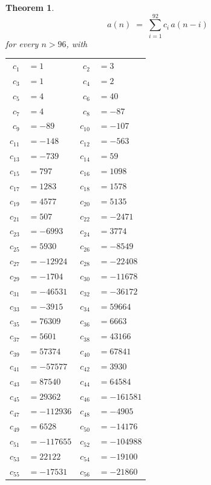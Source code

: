 \documentclass[11pt,a4paper]{article}
\theoremstyle{plain}
\newtheorem{theorem}{Theorem}
\theoremstyle{definition}
\begin{document}
\begin{theorem}
\[
a(n)\;=\;\sum_{i=1}^{92}c_i\,a(n-i)
\]
for every $n>96$, with
\begin{center}\footnotesize
\begin{tabular}{r@{\,}l@{\qquad}r@{\,}l}
$c_{1}$ & $=1$ & $c_{2}$ & $=3$ \\
$c_{3}$ & $=1$ & $c_{4}$ & $=2$ \\
$c_{5}$ & $=4$ & $c_{6}$ & $=40$ \\
$c_{7}$ & $=4$ & $c_{8}$ & $=-87$ \\
$c_{9}$ & $=-89$ & $c_{10}$ & $=-107$ \\
$c_{11}$ & $=-148$ & $c_{12}$ & $=-563$ \\
$c_{13}$ & $=-739$ & $c_{14}$ & $=59$ \\
$c_{15}$ & $=797$ & $c_{16}$ & $=1098$ \\
$c_{17}$ & $=1283$ & $c_{18}$ & $=1578$ \\
$c_{19}$ & $=4577$ & $c_{20}$ & $=5135$ \\
$c_{21}$ & $=507$ & $c_{22}$ & $=-2471$ \\
$c_{23}$ & $=-6993$ & $c_{24}$ & $=3774$ \\
$c_{25}$ & $=5930$ & $c_{26}$ & $=-8549$ \\
$c_{27}$ & $=-12924$ & $c_{28}$ & $=-22408$ \\
$c_{29}$ & $=-1704$ & $c_{30}$ & $=-11678$ \\
$c_{31}$ & $=-46531$ & $c_{32}$ & $=-36172$ \\
$c_{33}$ & $=-3915$ & $c_{34}$ & $=59664$ \\
$c_{35}$ & $=76309$ & $c_{36}$ & $=6663$ \\
$c_{37}$ & $=5601$ & $c_{38}$ & $=43166$ \\
$c_{39}$ & $=57374$ & $c_{40}$ & $=67841$ \\
$c_{41}$ & $=-57577$ & $c_{42}$ & $=3930$ \\
$c_{43}$ & $=87540$ & $c_{44}$ & $=64584$ \\
$c_{45}$ & $=29362$ & $c_{46}$ & $=-161581$ \\
$c_{47}$ & $=-112936$ & $c_{48}$ & $=-4905$ \\
$c_{49}$ & $=6528$ & $c_{50}$ & $=-14176$ \\
$c_{51}$ & $=-117655$ & $c_{52}$ & $=-104988$ \\
$c_{53}$ & $=22122$ & $c_{54}$ & $=-19100$ \\
$c_{55}$ & $=-17531$ & $c_{56}$ & $=-21860$ \\

\end{tabular}
\end{center}
\end{theorem}
\end{document}
